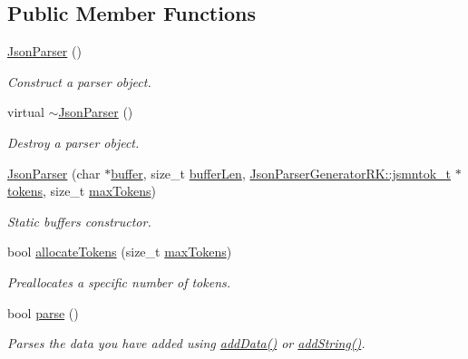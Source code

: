 \subsection*{Public Member Functions}
\begin{DoxyCompactItemize}
\item 
\hyperlink{class_json_parser_af21abdfb0ceac731e44d897a0285f5d4}{Json\+Parser} ()
\begin{DoxyCompactList}\small\item\em Construct a parser object. \end{DoxyCompactList}\item 
virtual \hyperlink{class_json_parser_a7c0393b54c37f9ff30b6bb59f0ba92ce}{$\sim$\+Json\+Parser} ()
\begin{DoxyCompactList}\small\item\em Destroy a parser object. \end{DoxyCompactList}\item 
\hyperlink{class_json_parser_a394f8fa82e72240ce4ad6e6ca25700b6}{Json\+Parser} (char $\ast$\hyperlink{class_json_buffer_aaee27fe51d12d68bd6031df3bc78b6b5}{buffer}, size\+\_\+t \hyperlink{class_json_buffer_af06130f43f71623ea6afe049c846e52b}{buffer\+Len}, \hyperlink{struct_json_parser_generator_r_k_1_1jsmntok__t}{Json\+Parser\+Generator\+R\+K\+::jsmntok\+\_\+t} $\ast$\hyperlink{class_json_parser_af2a9bba1dc92b0c38d0cab6fdad76216}{tokens}, size\+\_\+t \hyperlink{class_json_parser_a0dfa97de05bac37c5be2e1ee9747b8a2}{max\+Tokens})
\begin{DoxyCompactList}\small\item\em Static buffers constructor. \end{DoxyCompactList}\item 
bool \hyperlink{class_json_parser_a1731e3265d6b2f89587638dcd6d7ff34}{allocate\+Tokens} (size\+\_\+t \hyperlink{class_json_parser_a0dfa97de05bac37c5be2e1ee9747b8a2}{max\+Tokens})
\begin{DoxyCompactList}\small\item\em Preallocates a specific number of tokens. \end{DoxyCompactList}\item 
bool \hyperlink{class_json_parser_ad528213e8600cbad4d85910b62fc033a}{parse} ()
\begin{DoxyCompactList}\small\item\em Parses the data you have added using \hyperlink{class_json_buffer_a760cb5be42ed2d2ca9306b1109e76af3}{add\+Data()} or \hyperlink{class_json_buffer_a61bf30ac6e1bd460f1e809d02a7d5ba4}{add\+String()}. \end{DoxyCompactList}\item 

\end{DoxyCompactItemize}
